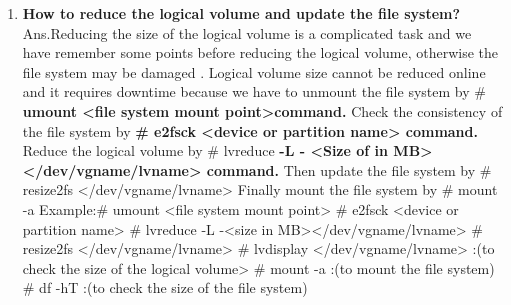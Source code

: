 \begin{enumerate}
\begin{enumerate}
    \bigskip
    \bigskip

    \item \textbf{How to reduce the logical volume and update the file system?}
    \newline
    Ans.Reducing the size of the logical volume is a complicated task and we have remember some points before reducing the logical volume, otherwise the file system may be damaged .
    Logical volume size cannot be reduced online and it requires downtime because we have to 
    unmount the file system by # \textbf{umount   <file system mount point>command.}
    Check the consistency of the file system by \textbf{# e2fsck   <device or partition name>  command.}
    Reduce the logical volume by # lvreduce   \textbf{-L   - <Size of in MB></dev/vgname/lvname> command.}
    Then update the file system by # resize2fs    </dev/vgname/lvname>
    Finally mount the file system by # mount  -a 
    Example:# umount    <file system mount point>
     # e2fsck   <device or partition name>
      # lvreduce   -L   -<size in MB></dev/vgname/lvname>
     # resize2fs   </dev/vgname/lvname>
     # lvdisplay   </dev/vgname/lvname>	:(to check the size of the logical volume>
     # mount   -a   :(to mount the file system)
     # df    -hT 		:(to check the size of the file system)

     \bigskip
     \bigskip


\end{enumerate}
\end{enumerate}
